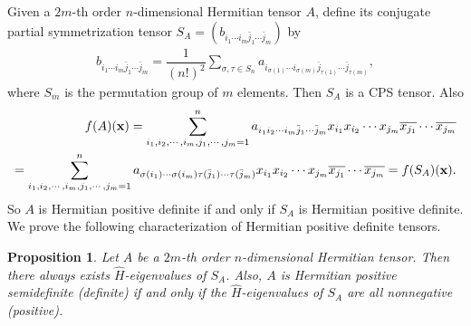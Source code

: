 \documentclass[10pt,reqno]{amsart}
\newtheorem{prop}[thm]{Proposition}
\theoremstyle{definition}
\begin{document}
Given a $2m$-th order $n$-dimensional Hermitian tensor $A$, define its conjugate partial symmetrization tensor $S_{A}=(b_{i_1\cdots i_m\bar{j}_1\cdots \bar{j}_m})$ by
\begin{align*}
b_{i_1\cdots i_m\bar{j}_1\cdots \bar{j}_m}=\dfrac{1}{(n!)^2}\sum_{\sigma, \tau\in S_n} a_{i_{\sigma(1)}\cdots i_{\sigma(m)}\bar{j}_{\tau(1)}\cdots \bar{j}_{\tau(m)}} ,
\end{align*}
	where $S_m$ is the permutation group of $m$ elements. Then $S_{A}$ is a CPS tensor. Also
 \begin{align} f(A)(\mathbf x)=\sum_{i_1, i_2,\cdots, i_m, j_1, \cdots, j_m=1}^n a_{i_1i_2\cdots i_m\bar{j}_1\cdots \bar{j}_m} x_{i_1} x_{i_2}\cdots x_{j_m}\overline{x_{j_1}}\cdots\overline{x_{j_m}}\\ \notag
=\sum_{i_1, i_2,\cdots, i_m, j_1, \cdots, j_m=1}^na_{\sigma(i_{1})\cdots \sigma(i_{m})\tau(\bar{j}_{1})\cdots \tau(\bar{j}_{m})}x_{i_1} x_{i_2}\cdots x_{j_m}\overline{x_{j_1}}\cdots\overline{x_{j_m}}=f(S_{A})(\mathbf x). \end{align}
So $A$ is Hermitian positive definite if and only if $S_{A}$ is Hermitian positive definite. We prove the following characterization of Hermitian positive definite tensors.
\begin{prop} \label{3.1}
Let $A$ be a $2m$-th order $n$-dimensional Hermitian tensor. Then there always exists $\hat{H}$-eigenvalues of $S_{A}$. Also, $A$ is Hermitian positive semidefinite (definite) if and only if the $\hat{H}$-eigenvalues of $S_{A}$ are all nonnegative (positive). 
\end{prop}
\end{document}
